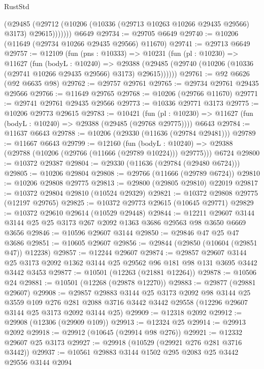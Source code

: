 \begin{lexlean}{RustStd}
\begin{coremodule}
            (@29485
              (@29712 (@10206 (@10336 (@29713 @10263 @10266 @29435 @29566) @3173) @29615)))))))
    @6649
@29734 := @29705 @6649
@29740 := @10206 (@11649 (@29734 @10266 @29435 @29566) @11670)
@29741 := @29713 @6649
@29757 := @12109
    (fun (pns : @10333) =>
    @10231
      (fun (pl : @10230) =>
      @11627
        (fun (bodyL : @10240) =>
        @29388 (@29485 (@29740 (@10206 (@10336 (@29741 @10266 @29435 @29566) @3173) @29615))))))
@29761 := @92 @6626 (@92 @6635 @98)
@29762 := @29757 @29761
@29765 := @29734 @29761 @29435 @29566
@29766 := @11649 @29765
@29768 := @10206 (@29766 @11670)
@29771 := @29741 @29761 @29435 @29566
@29773 := @10336 @29771 @3173
@29775 := @10206 @29773 @29615
@29783 := @10421
    (fun (pl : @10230) => @11627 (fun (bodyL : @10240) => @29388 (@29485 (@29768 @29775))))
    @6643
@29784 := @11637 @6643
@29788 := @10206 (@29330 (@11636 (@29784 @29481)))
@29789 := @11667 @6643
@29799 := @12160
    (fun (bodyL : @10240) => @29388 (@29788 (@10206 (@29766 (@11666 (@29789 @10224))) @29775)))
    @6724
@29800 := @10372 @29387
@29804 := @29330 (@11636 (@29784 (@29480 @6724)))
@29805 := @10206 @29804
@29808 := @29766 (@11666 (@29789 @6724))
@29810 := @10206 @29808 @29775
@29813 := @29800 (@29805 @29810) @22019
@29817 := @10372 @29804 @29810 (@10524 @29329)
@29821 := @10372 @29808 @29775 (@12197 @29765)
@29825 := @10372 @29773 @29615 (@10645 @29771)
@29829 := @10372 @29610 @29614 (@10529 @29448)
@29844 := @12211
    @29607
    @3144
    @3144
    @25
    @25
    @3173
    @267
    @2092
    @1363
    @3686
    @29563
    @98
    @3650
    @6669
    @3656
@29846 := @10596 @29607 @3144
@29850 := @29846 @47 @25 @47 @3686
@29851 := @10605 @29607
@29856 := @29844 (@29850 (@10604 (@29851 @47)) @12238)
@29857 := @12244 @29607
@29874 := @29857
    @29607
    @3144
    @25
    @3173
    @2092
    @1362
    @3144
    @25
    @29562
    @96
    @181
    @98
    @131
    @3695
    @3442
    @3442
    @3453
@29877 := @10501 (@12263 (@21881 @12264))
@29878 := @10506 @24
@29881 := @10501 (@12268 (@29878 @12270))
@29883 := @29877 (@29881 @29607)
@29908 := @29857
    @29883
    @3144
    @25
    @3173
    @2092
    @98
    @3144
    @25
    @3559
    @109
    @276
    @281
    @2088
    @3716
    @3442
    @3442
    @29558
    (@12296 @29607 @3144 @25 @3173 @2092 @3144 @25)
@29909 := @12318 @2092
@29912 := @29908 (@12306 (@29909 @109))
@29913 := @12324 @25
@29914 := @29913 @2092
@29918 := @29912 (@10645 (@29914 @98 @276))
@29921 := @12332 @29607 @25 @3173
@29927 := @29918 (@10529 (@29921 @276 @281 @3716 @3442))
@29937 := @10561 @29883 @3144 @1502 @295 @2083 @25 @3442 @29556 @3144 @2094

\end{coremodule}
\end{lexlean}
